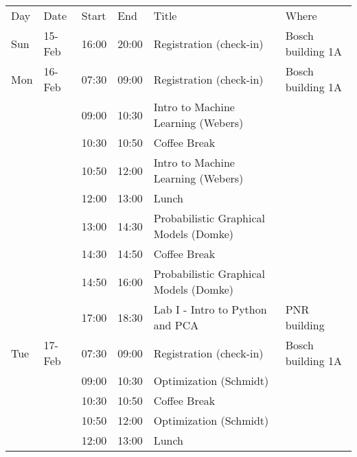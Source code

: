 \begin{table}[h]
\begin{tabular}{  l l l l p{7cm} l    }
Day & Date   & Start & End   & Title                                                             & Where             \\
Sun & 15-Feb & 16:00 & 20:00 & Registration (check-in)                                           & Bosch building 1A \\
Mon & 16-Feb & 07:30 & 09:00 & Registration (check-in)                                           & Bosch building 1A \\
    &        & 09:00 & 10:30 & Intro to Machine Learning  (Webers)                               &                   \\
    &        & 10:30 & 10:50 & Coffee Break                                                      &                   \\
    &        & 10:50 & 12:00 & Intro to Machine Learning  (Webers)                               &                   \\
    &        & 12:00 & 13:00 & Lunch                                                             &                   \\
    &        & 13:00 & 14:30 & Probabilistic Graphical Models (Domke)                            &                   \\
    &        & 14:30 & 14:50 & Coffee Break                                                      &                   \\
    &        & 14:50 & 16:00 & Probabilistic Graphical Models (Domke)                            &                   \\
    &        & 17:00 & 18:30 & Lab I - Intro to Python and PCA                                   & PNR building      \\
Tue & 17-Feb & 07:30 & 09:00 & Registration (check-in)                                           & Bosch building 1A \\
    &        & 09:00 & 10:30 & Optimization (Schmidt)                                            &                   \\
    &        & 10:30 & 10:50 & Coffee Break                                                      &                   \\
    &        & 10:50 & 12:00 & Optimization (Schmidt)                                            &                   \\
    &        & 12:00 & 13:00 & Lunch                                                             &                   \\

\end{tabular}
\end{table}
